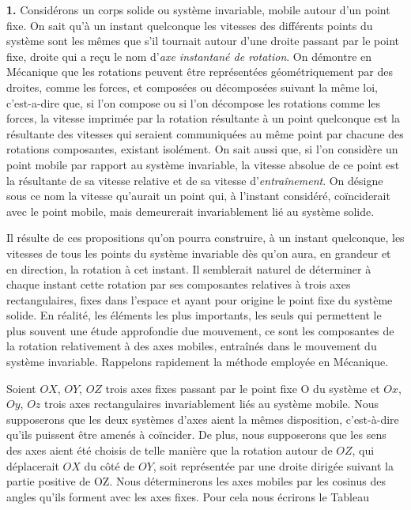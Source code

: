 \label{chp1}

\textbf{1.} Considérons un corps solide ou système invariable, mobile autour d'un point fixe. On sait qu'à un instant 
quelconque les vitesses des différents points du système sont les mêmes que s'il tournait autour d'une droite passant 
par le point fixe, droite qui a reçu le nom d'\textit{axe instantané de rotation}. On démontre en Mécanique que les 
rotations peuvent être représentées géométriquement par des droites, comme les forces, et composées ou décomposées 
suivant la même loi, c'est-a-dire que, si l'on compose ou si l'on décompose les rotations comme les forces, la vitesse 
imprimée par la rotation résultante à un point quelconque est la résultante des vitesses qui seraient communiquées au 
même point par chacune des rotations composantes, existant isolément. On sait aussi que, si l'on considère un point 
mobile par rapport au système invariable, la vitesse absolue de ce point est la résultante de sa vitesse relative et 
de sa vitesse d'\textit{entraînement}. On désigne sous ce nom la vitesse qu'aurait un point qui, à l'instant considéré, 
coïnciderait avec le point mobile, mais demeurerait invariablement lié au système solide.

Il résulte de ces propositions qu'on pourra construire, à un instant quelconque, les vitesses de tous les points du 
système invariable dès qu'on aura, en grandeur et en direction, la rotation à cet instant. Il semblerait naturel de 
déterminer à chaque instant cette rotation par ses composantes relatives à trois axes rectangulaires, fixes dans 
l'espace et ayant pour origine le point fixe du système solide. En réalité, les éléments les plus importants, les seuls 
qui permettent le plus souvent une étude approfondie due mouvement, ce sont les composantes de la rotation relativement 
à des axes mobiles, entraînés dans le mouvement du système invariable. Rappelons rapidement la méthode employée en 
Mécanique.

Soient $OX$, $OY$, $OZ$ trois axes fixes passant par le point fixe O du système et $Ox$, $Oy$, $Oz$ trois axes 
rectangulaires invariablement liés au système mobile. Nous supposerons que les deux systèmes d'axes aient la mêmes 
disposition, c'est-à-dire qu'ils puissent être amenés à coïncider. De plus, nous supposerons que les sens des axes 
aient été choisis de telle manière que la rotation autour de $OZ$, qui déplacerait $OX$ du côté de $OY$, soit 
représentée par une droite dirigée suivant la partie positive de OZ. Nous déterminerons les axes mobiles par les 
cosinus des angles qu'ils forment avec les axes fixes. Pour cela nous écrirons le Tableau

